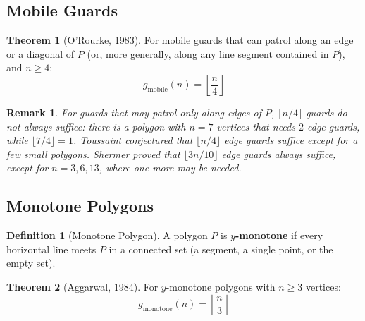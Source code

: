 \documentclass{article}
\newtheorem{remark}{Remark}
\theoremstyle{definition}
\newtheorem{theorem}{Theorem}
\newtheorem{definition}{Definition}
\begin{document}
\begin{center}
\end{center}

\subsection{Mobile Guards}

\begin{theorem}[O'Rourke, 1983]
For mobile guards that can patrol along an edge or a diagonal of $P$ (or, more generally, along any line segment contained in $P$), and $n \geq 4$:
$$g_{\text{mobile}}(n) = \left\lfloor \frac{n}{4} \right\rfloor$$
\end{theorem}

\begin{remark}
For guards that may patrol only along \emph{edges} of $P$, $\lfloor n/4 \rfloor$ guards do not always suffice: there is a polygon with $n = 7$ vertices that needs $2$ edge guards, while $\lfloor 7/4 \rfloor = 1$. Toussaint conjectured that $\lfloor n/4 \rfloor$ edge guards suffice except for a few small polygons. Shermer proved that $\lfloor 3n/10 \rfloor$ edge guards always suffice, except for $n = 3, 6, 13$, where one more may be needed.
\end{remark}

\subsection{Monotone Polygons}

\begin{definition}[Monotone Polygon]
A polygon $P$ is \textbf{$y$-monotone} if every horizontal line meets $P$ in a connected set (a segment, a single point, or the empty set).
\end{definition}

\begin{theorem}[Aggarwal, 1984]
For $y$-monotone polygons with $n \geq 3$ vertices:
$$g_{\text{monotone}}(n) = \left\lfloor \frac{n}{3} \right\rfloor$$
\end{theorem}
\end{document}
